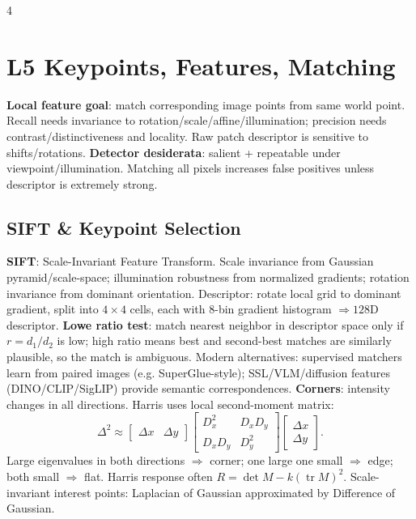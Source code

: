 \documentclass[8pt,a4paper,landscape]{extarticle}
\newcommand{\key}[1]{\textbf{#1}}
\begin{document}
\begin{multicols*}{4}
\section{L5 Keypoints, Features, Matching}
\key{Local feature goal}: match corresponding image points from same world point. Recall needs invariance to rotation/scale/affine/illumination; precision needs contrast/distinctiveness and locality. Raw patch descriptor is sensitive to shifts/rotations.
\key{Detector desiderata}: salient + repeatable under viewpoint/illumination. Matching all pixels increases false positives unless descriptor is extremely strong.
\subsection{SIFT \& Keypoint Selection}
\key{SIFT}: Scale-Invariant Feature Transform. Scale invariance from Gaussian pyramid/scale-space; illumination robustness from normalized gradients; rotation invariance from dominant orientation. Descriptor: rotate local grid to dominant gradient, split into $4\times4$ cells, each with 8-bin gradient histogram $\Rightarrow128$D descriptor.
\key{Lowe ratio test}: match nearest neighbor in descriptor space only if $r=d_1/d_2$ is low; high ratio means best and second-best matches are similarly plausible, so the match is ambiguous. Modern alternatives: supervised matchers learn from paired images (e.g. SuperGlue-style); SSL/VLM/diffusion features (DINO/CLIP/SigLIP) provide semantic correspondences.
\key{Corners}: intensity changes in all directions. Harris uses local second-moment matrix:
\[
\Delta^2\approx
\begin{bmatrix}\Delta x&\Delta y\end{bmatrix}
\begin{bmatrix}D_x^2&D_xD_y\\D_xD_y&D_y^2\end{bmatrix}
\begin{bmatrix}\Delta x\\\Delta y\end{bmatrix}.
\]
Large eigenvalues in both directions $\Rightarrow$ corner; one large one small $\Rightarrow$ edge; both small $\Rightarrow$ flat. Harris response often $R=\det M-k(\operatorname{tr}M)^2$. Scale-invariant interest points: Laplacian of Gaussian approximated by Difference of Gaussian.


\end{multicols*}
\end{document}
